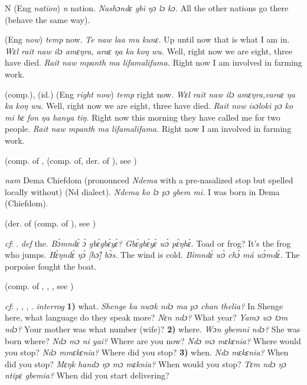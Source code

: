 \begin{letter}{N}
 (Eng \textit{nation}) \textit{n} nation. \textit{Nashɔndɛ gbi ŋɔ lɔ kɔ.} All the other nations go there (behave the same way).

 (Eng \textit{now}) \textit{temp} now. \textit{Te naw laa mu kunɛ.} Up until now that is what I am in. \textit{Wɛl rait naw ilɔ amɛŋra, araɛ ŋa ka koŋ wu.} Well, right now we are eight, three have died. \textit{Rait naw mpanth ma lifamalifama.} Right now I am involved in farming work.

 (comp.), (id.) (Eng \textit{right now}) \textit{temp} right now. \textit{Wɛl rait naw ilɔ amɛŋra,varaɛ ŋa ka koŋ wu.} Well, right now we are eight, three have died. \textit{Rait now isɔloki pɔ ko mi bɛ fon ŋa hanya tiŋ.} Right now this morning they have called me for two people. \textit{Rait naw mpanth ma lifamalifama.} Right now I am involved in farming work.

 (comp. of ,  (comp. of, der. of ), see ) 

 \textit{nam} Dema Chiefdom (pronounced \textit{Ndema} with a pre-nasalized stop but spelled locally without) (Nd dialect). \textit{Ndema ko lɔ pɔ gbem mi.} I was born in Dema (Chiefdom). 

 (der. of  (comp. of ), see ) 

 \textit{cf}: . \textit{def} the. \textit{Bɔ̀mndɛ́ ɔ̀ gbɛ́gbɛ́yɛ̀? Gbɛ́gbɛ́yɛ̀ wɔ̀ pɛ́ŋhɛ̀.} Toad or frog? It's the frog who jumps. \textit{Hɛ̀ŋndɛ́ ŋɔ́ [hɔ̃] bɔ̀s.} The wind is cold. \textit{Bìmndɛ́ wɔ̀ chɔ́ má wɔ̀mdɛ̀.} The porpoise fought the boat.

 (comp. of , , , see ) 

 \textit{cf}: , , , . \textit{interrog} \textbf{1)} what. \textit{Shenge ka nwɔk ndɔ ma pɔ chan thelia?} In Shenge here, what language do they speak more? \textit{Nɛn ndɔ?} What year? \textit{Yamɔ wɔ tɔm ndɔ?} Your mother was what number (wife)? \textbf{2)} where. \textit{Wɔn gbemni ndɔ?} She was born where? \textit{Ndɔ mɔ ni yai?} Where are you now? \textit{Ndɔ mɔ mɛkɛnia?} Where would you stop? \textit{Ndɔ mmɛkɛnia?} Where did you stop? \textbf{3)} when. \textit{Ndɔ mɛkɛnia?} When did you stop? \textit{Mɛŋk handɔ ŋɔ mɔ mɛknia?} When would you stop? \textit{Tɛm ndɔ ŋɔ ntipɛ gbemia?} When did you start delivering?


\end{letter}
